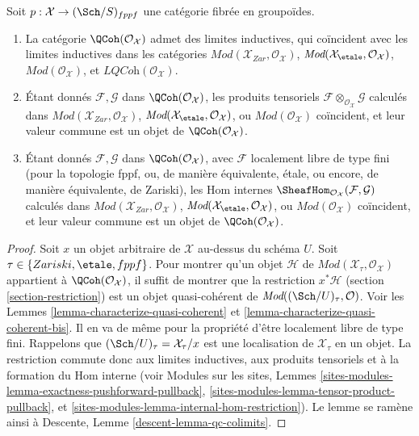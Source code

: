 \begin{lemma}
\label{lemma-qc-colimits}
Soit $p : \mathcal{X} \to (\Sch/S)_{fppf}$ une catégorie
fibrée en groupoïdes.
\begin{enumerate}
\item La catégorie $\QCoh(\mathcal{O}_\mathcal{X})$
admet des limites inductives, qui coïncident avec les limites inductives dans les catégories
$\textit{Mod}(\mathcal{X}_{Zar}, \mathcal{O}_\mathcal{X})$,
$\textit{Mod}(\mathcal{X}_\etale, \mathcal{O}_\mathcal{X})$,
$\textit{Mod}(\mathcal{O}_\mathcal{X})$, et
$\textit{LQCoh}(\mathcal{O}_\mathcal{X})$.
\item Étant donnés $\mathcal{F}, \mathcal{G}$ dans $\QCoh(\mathcal{O}_\mathcal{X})$,
les produits tensoriels $\mathcal{F} \otimes_{\mathcal{O}_\mathcal{X}} \mathcal{G}$
calculés dans $\textit{Mod}(\mathcal{X}_{Zar}, \mathcal{O}_\mathcal{X})$,
$\textit{Mod}(\mathcal{X}_\etale, \mathcal{O}_\mathcal{X})$, ou
$\textit{Mod}(\mathcal{O}_\mathcal{X})$ coïncident, et leur valeur commune
est un objet de $\QCoh(\mathcal{O}_\mathcal{X})$.
\item Étant donnés $\mathcal{F}, \mathcal{G}$ dans $\QCoh(\mathcal{O}_\mathcal{X})$,
avec $\mathcal{F}$ localement libre de type fini (pour la topologie fppf, ou, de manière équivalente, \'etale, ou
encore, de manière équivalente, de Zariski), les Hom internes
$\SheafHom_{\mathcal{O}_\mathcal{X}}(\mathcal{F}, \mathcal{G})$
calculés dans $\textit{Mod}(\mathcal{X}_{Zar}, \mathcal{O}_\mathcal{X})$,
$\textit{Mod}(\mathcal{X}_\etale, \mathcal{O}_\mathcal{X})$, ou
$\textit{Mod}(\mathcal{O}_\mathcal{X})$ coïncident, et leur valeur commune
est un objet de $\QCoh(\mathcal{O}_\mathcal{X})$.
\end{enumerate}
\end{lemma}

\begin{proof}
Soit $x$ un objet arbitraire de $\mathcal{X}$ au-dessus du schéma $U$.
Soit $\tau \in \{Zariski, \etale, fppf\}$. Pour montrer qu'un objet $\mathcal{H}$
de $\textit{Mod}(\mathcal{X}_\tau, \mathcal{O}_\mathcal{X})$ appartient
à $\QCoh(\mathcal{O}_\mathcal{X})$, il suffit de montrer que la
restriction $x^*\mathcal{H}$ (section \ref{section-restriction})
est un objet quasi-cohérent de $\textit{Mod}((\Sch/U)_\tau, \mathcal{O})$.
Voir les Lemmes \ref{lemma-characterize-quasi-coherent} et
\ref{lemma-characterize-quasi-coherent-bis}. Il en va de même pour la propriété d'être
localement libre de type fini. Rappelons que $(\Sch/U)_\tau = \mathcal{X}_\tau/x$
est une localisation de $\mathcal{X}_\tau$ en un objet. La restriction
commute donc aux limites inductives, aux produits tensoriels et à la formation du Hom interne
(voir Modules sur les sites, Lemmes
\ref{sites-modules-lemma-exactness-pushforward-pullback},
\ref{sites-modules-lemma-tensor-product-pullback}, et
\ref{sites-modules-lemma-internal-hom-restriction}).
Le lemme se ramène ainsi à Descente, Lemme \ref{descent-lemma-qc-colimits}.
\end{proof}






